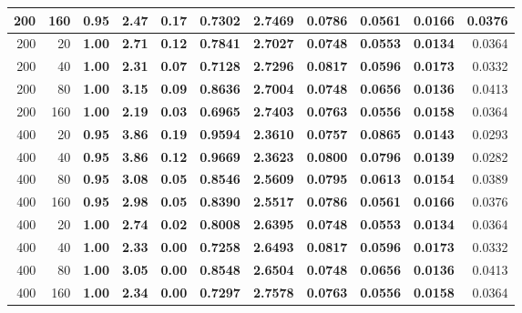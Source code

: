 \begin{table}
\begin{tabular}[t]{r|r|>{}r|>{}r|>{}r|>{}r|>{}r|>{}r|>{}r|>{}r|r}
\hline
200 & 160 & \textbf{0.95} & \textbf{2.47} & \textbf{0.17} & \textbf{0.7302} & \textbf{2.7469} & \textbf{0.0786} & \textbf{0.0561} & \textbf{0.0166} & 0.0376\\
\hline
200 & 20 & \textbf{1.00} & \textbf{2.71} & \textbf{0.12} & \textbf{0.7841} & \textbf{2.7027} & \textbf{0.0748} & \textbf{0.0553} & \textbf{0.0134} & 0.0364\\
\hline
200 & 40 & \textbf{1.00} & \textbf{2.31} & \textbf{0.07} & \textbf{0.7128} & \textbf{2.7296} & \textbf{0.0817} & \textbf{0.0596} & \textbf{0.0173} & 0.0332\\
\hline
200 & 80 & \textbf{1.00} & \textbf{3.15} & \textbf{0.09} & \textbf{0.8636} & \textbf{2.7004} & \textbf{0.0748} & \textbf{0.0656} & \textbf{0.0136} & 0.0413\\
\hline
200 & 160 & \textbf{1.00} & \textbf{2.19} & \textbf{0.03} & \textbf{0.6965} & \textbf{2.7403} & \textbf{0.0763} & \textbf{0.0556} & \textbf{0.0158} & 0.0364\\
\hline
400 & 20 & \textbf{0.95} & \textbf{3.86} & \textbf{0.19} & \textbf{0.9594} & \textbf{2.3610} & \textbf{0.0757} & \textbf{0.0865} & \textbf{0.0143} & 0.0293\\
\hline
400 & 40 & \textbf{0.95} & \textbf{3.86} & \textbf{0.12} & \textbf{0.9669} & \textbf{2.3623} & \textbf{0.0800} & \textbf{0.0796} & \textbf{0.0139} & 0.0282\\
\hline
400 & 80 & \textbf{0.95} & \textbf{3.08} & \textbf{0.05} & \textbf{0.8546} & \textbf{2.5609} & \textbf{0.0795} & \textbf{0.0613} & \textbf{0.0154} & 0.0389\\
\hline
400 & 160 & \textbf{0.95} & \textbf{2.98} & \textbf{0.05} & \textbf{0.8390} & \textbf{2.5517} & \textbf{0.0786} & \textbf{0.0561} & \textbf{0.0166} & 0.0376\\
\hline
400 & 20 & \textbf{1.00} & \textbf{2.74} & \textbf{0.02} & \textbf{0.8008} & \textbf{2.6395} & \textbf{0.0748} & \textbf{0.0553} & \textbf{0.0134} & 0.0364\\
\hline
400 & 40 & \textbf{1.00} & \textbf{2.33} & \textbf{0.00} & \textbf{0.7258} & \textbf{2.6493} & \textbf{0.0817} & \textbf{0.0596} & \textbf{0.0173} & 0.0332\\
\hline
400 & 80 & \textbf{1.00} & \textbf{3.05} & \textbf{0.00} & \textbf{0.8548} & \textbf{2.6504} & \textbf{0.0748} & \textbf{0.0656} & \textbf{0.0136} & 0.0413\\
\hline
400 & 160 & \textbf{1.00} & \textbf{2.34} & \textbf{0.00} & \textbf{0.7297} & \textbf{2.7578} & \textbf{0.0763} & \textbf{0.0556} & \textbf{0.0158} & 0.0364\\
\hline
\end{tabular}
\end{table}

